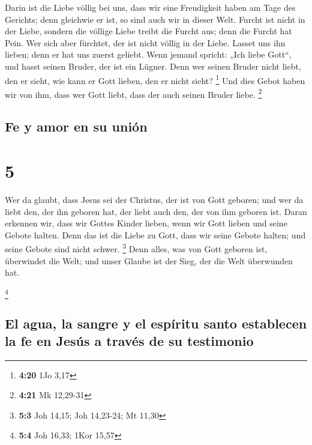  Darin ist die Liebe völlig bei uns, dass wir eine
Freudigkeit haben am Tage des Gerichts; denn gleichwie er ist, so sind
auch wir in dieser Welt.  Furcht ist nicht in der Liebe,
sondern die völlige Liebe treibt die Furcht aus; denn die Furcht hat
Pein. Wer sich aber fürchtet, der ist nicht völlig in der Liebe.
 Lasset uns ihn lieben; denn er hat uns zuerst geliebt.
 Wenn jemand spricht: „Ich liebe Gott``, und hasst seinen
Bruder, der ist ein Lügner. Denn wer seinen Bruder nicht liebt, den er
sieht, wie kann er Gott lieben, den er nicht sieht? \footnote{\textbf{4:20}
  1Jo 3,17}  Und dies Gebot haben wir von ihm, dass wer
Gott liebt, dass der auch seinen Bruder liebe. \footnote{\textbf{4:21}
  Mk 12,29-31}

\hypertarget{fe-y-amor-en-su-uniuxf3n}{%
\subsection{Fe y amor en su unión}\label{fe-y-amor-en-su-uniuxf3n}}

\hypertarget{section-4}{%
\section{5}\label{section-4}}

 Wer da glaubt, dass Jesus sei der Christus, der ist von
Gott geboren; und wer da liebt den, der ihn geboren hat, der liebt auch
den, der von ihm geboren ist.  Daran erkennen wir, dass
wir Gottes Kinder lieben, wenn wir Gott lieben und seine Gebote halten.
 Denn das ist die Liebe zu Gott, dass wir seine Gebote
halten; und seine Gebote sind nicht schwer. \footnote{\textbf{5:3} Joh
  14,15; Joh 14,23-24; Mt 11,30}  Denn alles, was von Gott
geboren ist, überwindet die Welt; und unser Glaube ist der Sieg, der die
Welt überwunden hat.

\footnote{\textbf{5:4} Joh 16,33; 1Kor 15,57}

\hypertarget{el-agua-la-sangre-y-el-espuxedritu-santo-establecen-la-fe-en-jesuxfas-a-travuxe9s-de-su-testimonio}{%
\subsection{El agua, la sangre y el espíritu santo establecen la fe en
Jesús a través de su
testimonio}\label{el-agua-la-sangre-y-el-espuxedritu-santo-establecen-la-fe-en-jesuxfas-a-travuxe9s-de-su-testimonio}}

